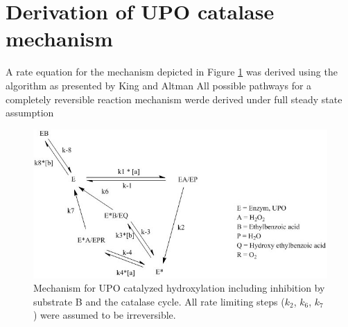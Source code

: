 \documentclass[12pt]{article}
\newcommand{\kma}{K_{mA}}
\newcommand{\kmaa}{K_{mA2}}
\newcommand{\kmb}{K_{mB}}
\newcommand{\kib}{K_{iB}}
\begin{document}
\section{Derivation of UPO catalase mechanism}
A rate equation for the mechanism depicted in Figure \ref{Upo-cycle} was derived using the algorithm as presented by King and Altman
All possible pathways for a completely reversible reaction mechanism werde derived under full steady state assumption %
\begin{figure}[h]
\label{Upo-cycle}
\centering
\includegraphics[width=1\textwidth]{"PingPong Comp Inhib Katalase cycle"}
\caption{Mechanism for UPO catalyzed hydroxylation including inhibition by substrate B and the catalase cycle. All rate limiting steps ($k_2$, $k_6$, $k_7$) were assumed to be irreversible.}
\end{figure}

\end{document}
